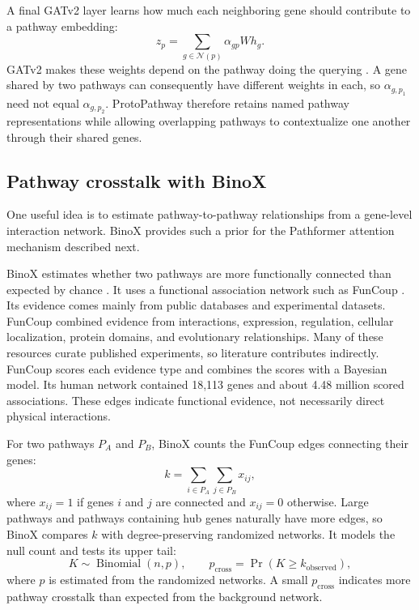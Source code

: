 \documentclass[11pt]{article}
\begin{document}
A final GATv2 layer learns how much each neighboring gene should contribute to
a pathway embedding:
\begin{equation}
    z_p = \sum_{g\in\mathcal{N}(p)} \alpha_{gp} W h_g.
\end{equation}
GATv2 makes these weights depend on the pathway doing the querying
\cite{brody2022attentive}. A gene shared by two pathways can consequently have
different weights in each, so $\alpha_{g,p_1}$ need not equal
$\alpha_{g,p_2}$. ProtoPathway therefore retains named pathway representations
while allowing overlapping pathways to contextualize one another through their
shared genes.


\subsection{Pathway crosstalk with BinoX}

One useful idea is to estimate pathway-to-pathway relationships from a
gene-level interaction network. BinoX provides such a prior for the Pathformer
attention mechanism described next.

BinoX estimates whether two pathways are more functionally connected than
expected by chance \cite{ogris2017binox}. It uses a functional association
network such as FunCoup \cite{schmitt2014funcoup}. Its evidence comes mainly
from public databases and experimental datasets. FunCoup combined evidence
from interactions, expression, regulation, cellular localization, protein
domains, and evolutionary relationships.
Many of these resources curate published experiments, so literature contributes
indirectly. FunCoup scores each evidence type and combines the scores with a
Bayesian model. Its human network contained 18,113 genes and about 4.48 million
scored associations. These edges indicate functional evidence, not necessarily
direct physical interactions.

For two pathways $P_A$ and $P_B$, BinoX counts the FunCoup edges connecting
their genes:
\begin{equation}
    k = \sum_{i\in P_A}\sum_{j\in P_B}x_{ij},
\end{equation}
where $x_{ij}=1$ if genes $i$ and $j$ are connected and $x_{ij}=0$ otherwise.
Large pathways and pathways containing hub genes naturally have more edges, so
BinoX compares $k$ with degree-preserving randomized networks. It models the
null count and tests its upper tail:
\begin{equation}
    K\sim\operatorname{Binomial}(n,p),
    \qquad
    p_{\mathrm{cross}}=\Pr(K\geq k_{\mathrm{observed}}),
\end{equation}
where $p$ is estimated from the randomized networks. A small
$p_{\mathrm{cross}}$ indicates more pathway crosstalk than expected from the
background network.
\end{document}
